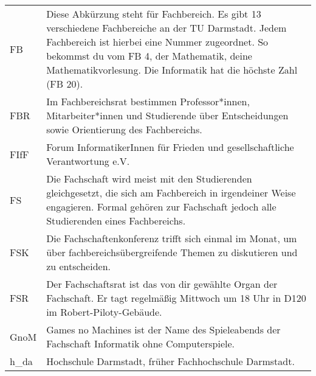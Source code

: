\begin{longtable}{p{20mm}p{85mm}}
    FB           & Diese Abkürzung steht für Fachbereich. Es gibt 13 verschiedene Fachbereiche an der TU Darmstadt. Jedem Fachbereich ist hierbei eine Nummer zugeordnet. So bekommst du vom FB 4, der Mathematik, deine Mathematikvorlesung. Die Informatik hat die höchste Zahl (FB 20). \\
    FBR          & Im Fachbereichsrat bestimmen Professor*innen, Mitarbeiter*innen und Studierende über Entscheidungen sowie Orientierung des Fachbereichs.                                                                                                                                \\
    FIfF         & Forum InformatikerInnen für Frieden und gesellschaftliche Verantwortung e.V.                                                                                                                                                                                            \\
    FS           & Die Fachschaft wird meist mit den Studierenden gleichgesetzt, die sich am Fachbereich in irgendeiner Weise engagieren. Formal gehören zur Fachschaft jedoch alle Studierenden eines Fachbereichs.                                                                       \\
    FSK          & Die Fachschaftenkonferenz trifft sich einmal im Monat, um über fachbereichsübergreifende Themen zu diskutieren und zu entscheiden.                                                                                                                                      \\
    FSR          & Der Fachschaftsrat ist das von dir gewählte Organ der Fachschaft. Er tagt regelmäßig Mittwoch um 18 Uhr in D120 im Robert-Piloty-Gebäude.                                                                                                                               \\
    GnoM         & Games no Machines ist der Name des Spieleabends der Fachschaft Informatik ohne Computerspiele.                                                                                                                                                                          \\
    h\_da        & Hochschule Darmstadt, früher Fachhochschule Darmstadt.                                                                                                                                                                                                                  \\

\end{longtable}
